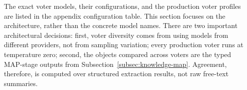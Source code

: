 The exact voter models, their configurations, and the production voter profiles are listed in the appendix configuration table. This section focuses on the architecture, rather than the concrete model names. There are two important architectural decisions: first, voter diversity comes from using models from different providers, not from sampling variation; every production voter runs at temperature zero; second, the objects compared across voters are the typed MAP-stage outputs from Subsection~\ref{subsec:knowledge-map}. Agreement, therefore, is computed over structured extraction results, not raw free-text summaries.